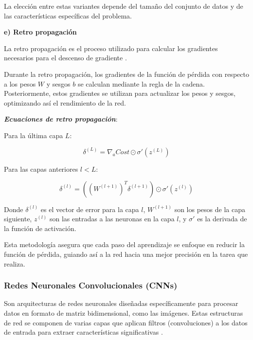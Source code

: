 La elección entre estas variantes depende del tamaño del conjunto de datos y de las características específicas del problema.

\textbf{e) Retro propagación}

La retro propagación es el proceso utilizado para calcular los gradientes necesarios para el descenso de gradiente \cite{rashid2016make}.

Durante la retro propagación, los gradientes de la función de pérdida con respecto a los pesos \(W\) y sesgos \(b\) se calculan mediante la regla de la cadena. Posteriormente, estos gradientes se utilizan para actualizar los pesos y sesgos, optimizando así el rendimiento de la red.

\textbf{\textit{Ecuaciones de retro propagación}}:

Para la última capa \(L\):

\begin{equation}
    \delta^{(L)} = \nabla_a Cost \odot \sigma'(z^{(L)})
\end{equation}

Para las capas anteriores \(l < L\):

\begin{equation}
    \delta^{(l)} = ((W^{(l+1)})^T \delta^{(l+1)}) \odot \sigma'(z^{(l)})
\end{equation}

Donde \(\delta^{(l)}\) es el vector de error para la capa \(l\), \(W^{(l+1)}\) son los pesos de la capa siguiente, \(z^{(l)}\) son las entradas a las neuronas en la capa \(l\), y \(\sigma'\) es la derivada de la función de activación.

Esta metodología asegura que cada paso del aprendizaje se enfoque en reducir la función de pérdida, guiando así a la red hacia una mejor precisión en la tarea que realiza.

\subsubsection{Redes Neuronales Convolucionales (CNNs)}
Son arquitecturas de redes neuronales diseñadas específicamente para procesar datos en formato de matriz bidimensional, como las imágenes. Estas estructuras de red se componen de varias capas que aplican filtros (convoluciones) a los datos de entrada para extraer características significativas \cite{geron2019hands}.

